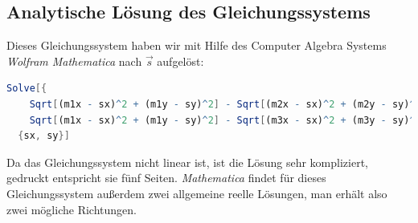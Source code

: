 \subsection{Analytische Lösung des Gleichungssystems}
Dieses Gleichungssystem haben wir mit Hilfe des Computer Algebra Systems \textit{Wolfram Mathematica}\cite{mathematica} nach $\vec{s}$ aufgelöst:
\begin{lstlisting}[language=Mathematica,caption={Befehl um das Gleichungssystem in \textit{Mathematica} zu lösen}]
  Solve[{
    Sqrt[(m1x - sx)^2 + (m1y - sy)^2] - Sqrt[(m2x - sx)^2 + (m2y - sy)^2] = dx12,
    Sqrt[(m1x - sx)^2 + (m1y - sy)^2] - Sqrt[(m3x - sx)^2 + (m3y - sy)^2] = dx13,}
  {sx, sy}]
\end{lstlisting}
Da das Gleichungssystem nicht linear ist, ist die Lösung sehr kompliziert, gedruckt entspricht sie fünf Seiten. \textit{Mathematica} findet für dieses Gleichungssystem außerdem zwei allgemeine reelle Lösungen, man erhält also zwei mögliche Richtungen.
